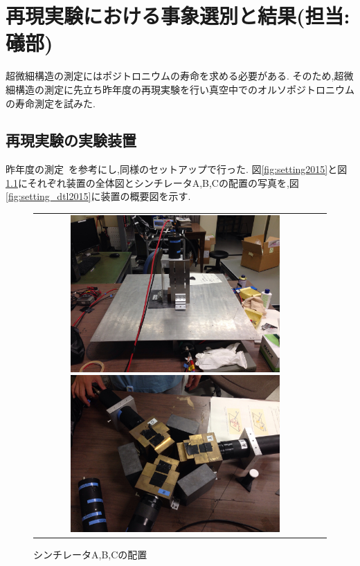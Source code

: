 \chapter{再現実験における事象選別と結果(担当:礒部)}\label{result}

超微細構造の測定にはポジトロニウムの寿命を求める必要がある.
そのため,超微細構造の測定に先立ち昨年度の再現実験を行い真空中でのオルソポジトロニウムの寿命測定を試みた.

\section{再現実験の実験装置}
昨年度の測定~\cite{卒業論文2015}を参考にし,同様のセットアップで行った.
図\ref{fig:setting2015}と図\ref{fig:pmt_setting2015}にそれぞれ装置の全体図とシンチレータA,B,Cの配置の写真を,図\ref{fig:setting_dtl2015}に装置の概要図を示す.
\begin{figure}[htbp]
	\begin{tabular}{cc}
		\begin{minipage}{0.5\hsize}
			\centering
				\includegraphics[width=80mm]{img/isb/setting_overview.JPG}
				\caption{装置の全体写真}
				\label{fig:setting2015}
		\end{minipage}
		\begin{minipage}{0.5\hsize}
			\centering
			\includegraphics[width=80mm]{img/isb/pmt_setting.JPG}
				\caption{シンチレータA,B,Cの配置}
				\label{fig:pmt_setting2015}
		\end{minipage}
	\end{tabular}
\end{figure}

